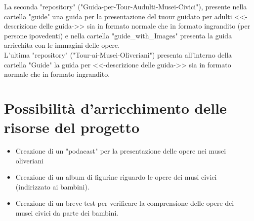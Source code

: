 \documentclass[hidelinks,12pt,a4paper]{article}
\begin{document}
\begin{flushleft}
				 La seconda "repository" ("Guida-per-Tour-Audulti-Musei-Civici"), presente nella cartella "guide" una guida per la presentazione del tuour guidato per adulti <<-descrizione delle guida->> sia in formato normale che in formato ingrandito (per persone ipovedenti) e nella cartella "guide_with_Images" presenta la guida arricchita con le immagini delle opere.\\
				 L'ultima "repository" ("Tour-ai-Musei-Oliveriani") presenta all'interno della cartella "Guide" la guida per <<-descrizione delle guida->>  sia in formato normale che in formato ingrandito.
				 
		\section{Possibilità d'arricchimento delle risorse del progetto}
		
		\begin{itemize}
			\item Creazione di un "podacast" per la presentazione delle opere nei musei oliveriani
			\item Creazione di un album di figurine riguardo le opere dei musi civici (indirizzato ai bambini).
			\item Creazione di un breve test per verificare la comprensione delle opere dei musei civici da parte dei bambini.  
		\end{itemize}
	
		\vspace*{\fill}
		\doclicenseThis
				
	\end{flushleft}
\end{document}
